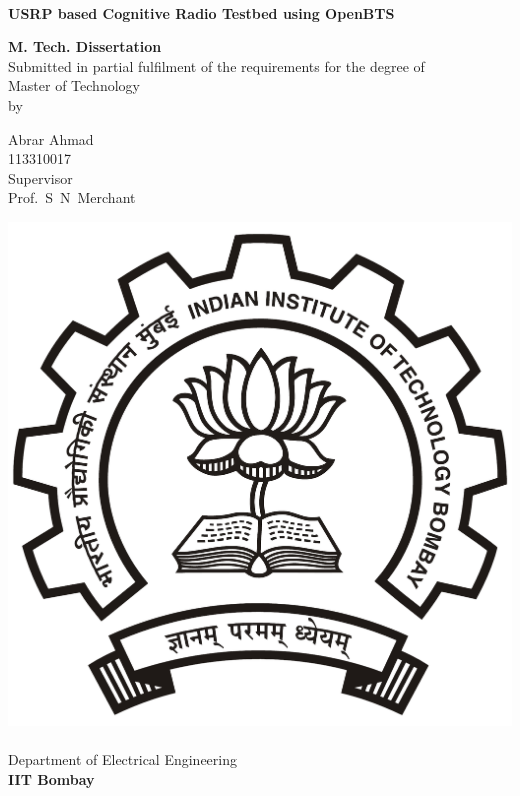 \begin{titlepage}
\begin{center}
\begin{spacing}{1.0}


~\\[0.3cm]
{ \LARGE \bfseries USRP based Cognitive Radio Testbed using OpenBTS\\[1.2cm] }

\textbf{\large M. Tech. Dissertation}\\[1.2cm]

{Submitted in partial fulfilment of the requirements for the degree of\\[0.1cm]
Master of Technology\\[0.3cm]
by\\[0.3cm]}

{\LARGE Abrar Ahmad\\[0.1cm]}
{113310017\\[1.1cm]}
{Supervisor\\[0.1cm]}
{\LARGE Prof.~S~N~Merchant\\[1.3cm]}

\includegraphics[width=0.21\textheight]{iitbLogo}~\\[0.9cm]
Department of Electrical Engineering\\[0.2cm]
\textbf{\large IIT Bombay}\\[1.3cm]


\end{spacing}
\end{center}
\end{titlepage}
